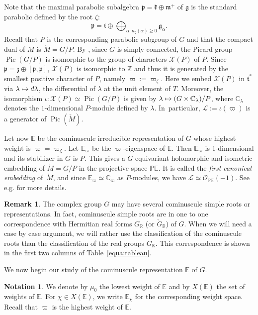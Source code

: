 \documentclass[10pt]{amsart}
\let\mathcal\mathscr
\newcommand{\mto}{\mathchoice{\longmapsto}{\mapsto}{\mapsto}{\mapsto}}
\theoremstyle{plain}
\theoremstyle{definition}
\newtheorem{nota}[theo]{Notation}
\newtheorem{rema}[theo]{Remark}
\DeclareMathOperator{\Pic}{Pic}
\newcommand{\cL}{\mathcal{L}}
\newcommand{\cO}{\mathcal{O}}
\newcommand{\cX}{\mathcal{X}}
\newcommand{\bC}{\mathbb{C}}
\newcommand{\bE}{\mathbb{E}}
\newcommand{\bP}{\mathbb{P}}
\newcommand{\bZ}{\mathbb{Z}}
\newcommand{\bR}{\mathbb{R}}
\newcommand{\fgg}{\mathfrak{g}}
\newcommand{\fk}{\mathfrak{k}}
\newcommand{\fm}{\mathfrak{m}}
\newcommand{\fp}{\mathfrak{p}}
\newcommand{\ft}{\mathfrak{t}}
\newcommand{\fz}{\mathfrak{z}}
\providecommand{\eg}{e.g.}\providecommand{\ie}{i.e.}\providecommand{\etc}{etc.}\providecommand{\resp}{resp.}\providecommand{\cf}{cf.}
\begin{document}
Note that the maximal parabolic subalgebra $\fp=\fk\oplus\fm^+$ of $\fgg$ is the standard parabolic defined by the root
$\zeta$:
$$\fp=\ft\oplus\bigoplus_{\alpha:n_\zeta(\alpha)\geq 0}\fgg_\alpha.$$
Recall that $P$ is the corresponding parabolic subgroup of $G$ and that the compact
dual of $M$ is $\check{M}=G/P$.
By \cite{Murakami}, since $G$ is simply connected, the Picard group $\Pic(G/P)$ is
isomorphic to
the group of characters $\cX(P)$ of $P$. Since $\fp=\fz\oplus[\fp,\fp]$, $\cX(P)$ is isomorphic to
$\bZ$ and thus it is generated by the smallest positive character of $P$, namely $\varpi:=\varpi_\zeta$.
Here we embed $\cX(P)$ in $\ft^*$ via $\lambda \mto d\lambda$, the differential of $\lambda$ at the unit
element of $T$.
Moreover, the isomorphism $\iota:\cX(P) \simeq \Pic(G/P)$ is given by
$\lambda \mto (G \times \bC_\lambda)/P$,
where $\bC_\lambda$ denotes the $1$-dimensional $P$-module defined by $\lambda$.
In~particular, $\cL:=\iota(\varpi)$
is a generator of $\Pic(\check{M})$.

Let now $\bE$ be the cominuscule irreducible representation of $G$ whose highest weight is
$\varpi=\varpi_\zeta$. Let $\bE_\varpi$
be the $\varpi$-eigenspace of $\bE$. Then $\bE_\varpi$ is 1-dimensional and its
stabilizer in $G$ is $P$. This gives a $G$-equivariant holomorphic and isometric embedding of
$\check{M}=G/P$ in the projective space $\bP\bE$. It is called the \emph{first canonical embedding} of~$\check{M}$, and since $\bE_\varpi\simeq \bC_{\varpi}$ as $P$-modules,
we have $\cL \simeq \cO_{\bP
\bE}(-1)$.
See \eg \cite{nakagawa} for more details.

\begin{rema}
The complex group $G$ may have several cominuscule simple roots or representations. In
fact, cominuscule simple roots are in one to one correspondence with Hermitian real forms
$G_\bR$ (or $\check{G}_\bR$) of $G$.
When we will need a case by case argument, we will rather use the
classification of the cominuscule roots than the classification of the real groups $G_\bR$. This correspondence
is shown in the first two columns of Table~\ref{equa:tableau}.
\end{rema}

We now begin our study of the cominuscule representation $\bE$ of $G$.

\begin{nota}
We denote by $\mu_0$ the lowest weight of $\bE$ and by $X(\bE)$ the set
of weights of $\bE$. For $\chi \in X(\bE)$, we write
$\bE_\chi$ for the corresponding weight space. Recall that $\varpi$ is the highest weight of $\bE$.
\end{nota}
\end{document}

